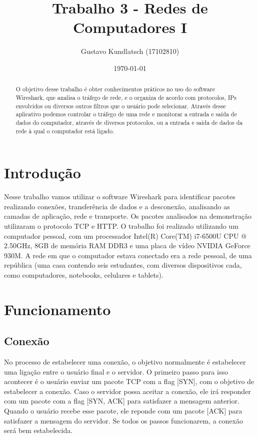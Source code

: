 \documentclass{article}
\title{Trabalho 3 - Redes de Computadores I}
\author{Gustavo Kundlatsch (17102810)}
\date{\today}
\begin{document}
\maketitle

\begin{abstract}
    O objetivo desse trabalho é obter conhecimentos práticos no uso do software Wireshark, que analisa o tráfego de rede, e o organiza de acordo com protocolos, IPs envolvidos ou diversos outros filtros que o usuário pode selecionar. Através desse aplicativo podemos controlar o tráfego de uma rede e monitorar a entrada e saída de dados do computador, através de diversos protocolos, ou a entrada e saída de dados da rede à qual o computador está ligado.
\end{abstract}{}

\section{Introdução}

Nesse trabalho vamos utilizar o software Wireshark para identificar pacotes realizando conexões, transferência de dados e a desconexão, analisando as camadas de aplicação, rede e transporte. Os pacotes analisados na demonstração utilizaram o protocolo TCP e HTTP. O trabalho foi realizado utilizando um computador pessoal, com um processador Intel(R) Core(TM) i7-6500U CPU @ 2.50GHz, 8GB de memória RAM DDR3 e uma placa de vídeo NVIDIA GeForce 930M. A rede em que o computador estava conectado era a rede pessoal, de uma república (uma casa contendo seis estudantes, com diversos dispositivos cada, como computadores, notebooks, celulares e tablets).

\section{Funcionamento}

\subsection{Conexão}

No processo de estabelecer uma conexão, o objetivo normalmente é estabelecer uma ligação entre o usuário final e o servidor. O primeiro passo para isso acontecer é o usuário enviar um pacote TCP com a flag [SYN], com o objetivo de estabelecer a conexão. Caso o servidor possa aceitar a conexão, ele irá responder com um pacote com a flag [SYN, ACK] para satisfazer a mensagem anterior. Quando o usuário recebe esse pacote, ele reponde com um pacote [ACK] para satisfazer a mensagem do servidor. Se todos os passos funcionarem, a conexão será bem estabelecida.
\end{document}
